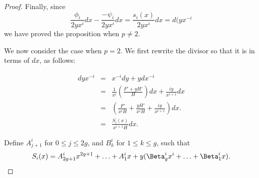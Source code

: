 \documentclass[draft, 11pt]{article} %
\theoremstyle{plain}
\theoremstyle{remark}
\begin{document}
\begin{proof}
Finally, since 
\[ 
\frac{\phi_i}{2yx^i}dx - \frac{-\psi_i}{2yx^i}dx = \frac{s_i(x)}{2yx^i}dx = d(yx^{-i}
\]
we have proved the proposition when $p\neq 2$.

We now consider the case when $p=2$.
We first rewrite the divisor so that it is in terms of $dx$, as follows:

\begin{eqnarray*}
dyx^{-i} & = & x^{-i}dy + ydx^{-i} \\
& = & \frac{1}{x^i} \left( \frac{F' + yH'}{H}\right) dx + \frac{iy}{x^{i+1}}dx \\
& = & \left( \frac{F'}{x^iH} + \frac{yH'}{x^iH} + \frac{iy}{x^{i+1}} \right) dx.\\
& = & \frac{S_i(x)}{x^{i+1}H}dx.
\end{eqnarray*}

Define $A^i_{j+1}$ for $0 \leq j \leq 2g$, and $B_k^i$ for $1\leq k \leq g$, such that
\[
	S_i(x) = A_{2g+1}^ix^{2g+1} + \ldots + A^i_1 x + y(\Beta_g^i x^i + \ldots + \Beta_1^i x).
\] 

\end{proof}



\begin{comment}
We define $\alpha^i_j$ and $\Alpha^i_{j+1}$ for $0 \leq j \leq 2g$, and $\Beta_k^i$ for $1\leq k \leq g$, such that
\[
	$s_i(x) = \alpha^i_{2g}x^{2g} + \ldots + \alpha^i_0 \ {\rm and } \ S_i(x) = A_{2g+1}^ix^{2g+1} + \ldots + A^i_1 x + y(\Beta_g^i x^i + \ldots + \Beta_1^i x).
\] 
\end{comment}


	
\end{document}
